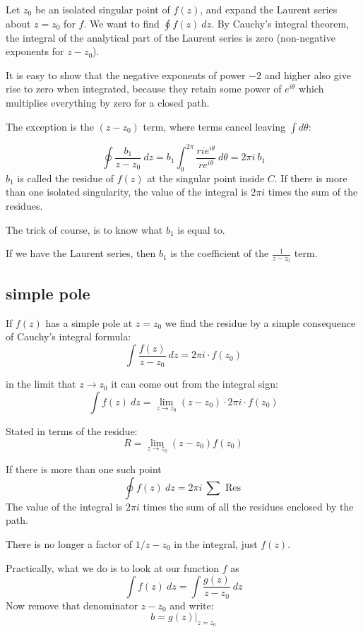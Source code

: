 \documentclass[11pt, oneside]{article}
\begin{document}
Let $z_0$ be an isolated singular point of $f(z)$, and expand the Laurent series about $z = z_0$ for $f$.  We want to find $\oint f(z) \ dz$.  By Cauchy's integral theorem, the integral of the analytical part of the Laurent series is zero (non-negative exponents for $z - z_0$).

It is easy to show that the negative exponents of power $-2$ and higher also give rise to zero when integrated, because they retain some power of $e^{i \theta}$ which multiplies everything by zero for a closed path.

The exception is the $(z-z_0)$ term, where terms cancel leaving $\int d \theta$:

\[ \oint \frac{b_1}{z - z_0} \ dz = b_1 \int_0^{2 \pi} \frac{ri e^{i \theta}}{r e^{i \theta}} \ d \theta = 2 \pi i \ b_1 \]
$b_1$ is called the residue of $f(z)$ at the singular point inside $C$.  If there is more than one isolated singularity, the value of the integral is $2 \pi i$ times the sum of the residues.

The trick of course, is to know what $b_1$ is equal to.

If we have the Laurent series, then $b_1$ is the coefficient of the $\frac{1}{z - z_0}$ term.

\subsection*{simple pole}

If $f(z)$ has a simple pole at $z = z_0$ we find the residue by a simple consequence of Cauchy's integral formula:
\[ \int \frac{f(z)}{z - z_0} \ dz = 2 \pi i \cdot f(z_0) \]

in the limit that $z \rightarrow z_0$ it can come out from the integral sign:
\[ \int f(z) \ dz = \lim_{z \rightarrow z_0} (z - z_0) \cdot 2 \pi i \cdot f(z_0) \]

Stated in terms of the residue: 
\[ R = \lim_{z \rightarrow z_0} (z - z_0) f(z_0) \]

If there is more than one such point
\[ \oint f(z) \ dz = 2 \pi i \ \sum \text{ Res } \]
The value of the integral is $2 \pi i$ times the sum of all the residues enclosed by the path.

There is no longer a factor of $1/z-z_0$ in the integral, just $f(z)$.

Practically, what we do is to look at our function $f$ as
\[ \int f(z) \ dz = \int \frac{g(z)}{z - z_0} \ dz \]
Now remove that denominator $z - z_0$ and write:
\[ b = g(z) \bigg |_{z=z_0} \]
\end{document}
